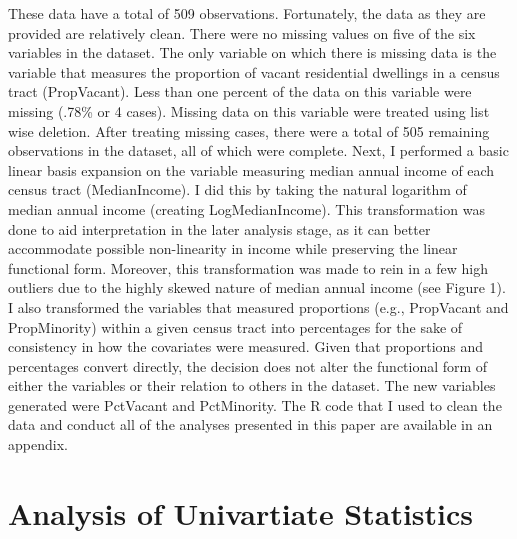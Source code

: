 \documentclass[titlepage]{article}   	%
\begin{document}
\indent These data have a total of 509 observations. Fortunately, the data as they are provided are relatively clean. There were no missing values on five of the six variables in the dataset. The only variable on which there is missing data is the variable that measures the proportion of vacant residential dwellings in a census tract (PropVacant). Less than one percent of the data on this variable were missing (.78\% or 4 cases). Missing data on this variable were treated using list wise deletion. After treating missing cases, there were a total of 505 remaining observations in the dataset, all of which were complete. Next, I performed a basic linear basis expansion on the variable measuring median annual income of each census tract (MedianIncome). I did this by taking the natural logarithm of median annual income (creating LogMedianIncome). This transformation was done to aid interpretation in the later analysis stage, as it can better accommodate possible non-linearity in income while preserving the linear functional form. Moreover, this transformation was made to rein in a few high outliers due to the highly skewed nature of median annual income (see Figure 1). I also transformed the variables that measured proportions (e.g., PropVacant and PropMinority) within a given census tract into percentages for the sake of consistency in how the covariates were measured. Given that proportions and percentages convert directly, the decision does not alter the functional form of either the variables or their relation to others in the dataset. The new variables generated were PctVacant and PctMinority. The R code that I used to clean the data and conduct all of the analyses presented in this paper are available in an appendix. 

\section{Analysis of Univartiate Statistics}
\end{document}
